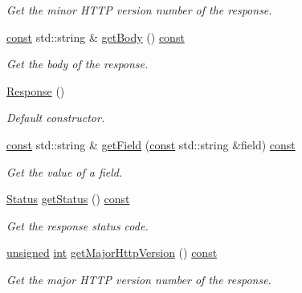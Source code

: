\begin{DoxyCompactItemize}
\begin{DoxyCompactList}\small\item\em Get the minor H\-T\-T\-P version number of the response. \end{DoxyCompactList}\item 
\hyperlink{term__entry_8h_a57bd63ce7f9a353488880e3de6692d5a}{const} std\-::string \& \hyperlink{classsf_1_1_http_1_1_response_a6b74ef73051a16ebb20041495c758e22}{get\-Body} () \hyperlink{term__entry_8h_a57bd63ce7f9a353488880e3de6692d5a}{const} 
\begin{DoxyCompactList}\small\item\em Get the body of the response. \end{DoxyCompactList}\item 
\hyperlink{classsf_1_1_http_1_1_response_a2e51c89356fe6a007c448a841a9ec08c}{Response} ()
\begin{DoxyCompactList}\small\item\em Default constructor. \end{DoxyCompactList}\item 
\hyperlink{term__entry_8h_a57bd63ce7f9a353488880e3de6692d5a}{const} std\-::string \& \hyperlink{classsf_1_1_http_1_1_response_a25d7cf86538a1045d31e0b601090b8f0}{get\-Field} (\hyperlink{term__entry_8h_a57bd63ce7f9a353488880e3de6692d5a}{const} std\-::string \&field) \hyperlink{term__entry_8h_a57bd63ce7f9a353488880e3de6692d5a}{const} 
\begin{DoxyCompactList}\small\item\em Get the value of a field. \end{DoxyCompactList}\item 
\hyperlink{classsf_1_1_http_1_1_response_a663e071978e30fbbeb20ed045be874d8}{Status} \hyperlink{classsf_1_1_http_1_1_response_a542e9856b1dd260a83940eb982b7f19a}{get\-Status} () \hyperlink{term__entry_8h_a57bd63ce7f9a353488880e3de6692d5a}{const} 
\begin{DoxyCompactList}\small\item\em Get the response status code. \end{DoxyCompactList}\item 
\hyperlink{curses_8priv_8h_aca40206900cfc164654362fa8d4ad1e6}{unsigned} \hyperlink{term__entry_8h_ad65b480f8c8270356b45a9890f6499ae}{int} \hyperlink{classsf_1_1_http_1_1_response_a3da9c689318b945dd12cbe7167161dc6}{get\-Major\-Http\-Version} () \hyperlink{term__entry_8h_a57bd63ce7f9a353488880e3de6692d5a}{const} 
\begin{DoxyCompactList}\small\item\em Get the major H\-T\-T\-P version number of the response. \end{DoxyCompactList}\item 

\end{DoxyCompactItemize}
